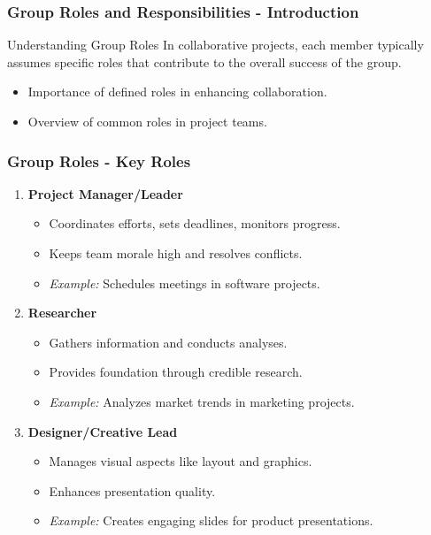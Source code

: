 \documentclass[aspectratio=169]{beamer}
\begin{document}
\begin{frame}[fragile]
    \frametitle{Group Roles and Responsibilities - Introduction}
    \begin{block}{Understanding Group Roles}
        In collaborative projects, each member typically assumes specific roles that contribute to the overall success of the group.
    \end{block}
    \begin{itemize}
        \item Importance of defined roles in enhancing collaboration.
        \item Overview of common roles in project teams.
    \end{itemize}
\end{frame}

\begin{frame}[fragile]
    \frametitle{Group Roles - Key Roles}
    \begin{enumerate}
        \item \textbf{Project Manager/Leader}
            \begin{itemize}
                \item Coordinates efforts, sets deadlines, monitors progress.
                \item Keeps team morale high and resolves conflicts.
                \item \textit{Example:} Schedules meetings in software projects.
            \end{itemize}
        
        \item \textbf{Researcher}
            \begin{itemize}
                \item Gathers information and conducts analyses.
                \item Provides foundation through credible research.
                \item \textit{Example:} Analyzes market trends in marketing projects.
            \end{itemize}
        
        \item \textbf{Designer/Creative Lead}
            \begin{itemize}
                \item Manages visual aspects like layout and graphics.
                \item Enhances presentation quality.
                \item \textit{Example:} Creates engaging slides for product presentations.
            \end{itemize}
    \end{enumerate}
\end{frame}
\end{document}
